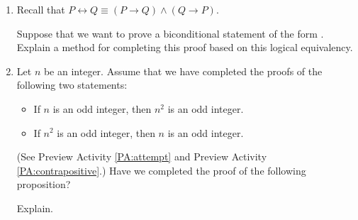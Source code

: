 \hbreak
%
\pagebreak
\begin{previewactivity}\label{PA:biconditional} \hfill
{}%
%
%
\begin{enumerate}

  \item Recall that  
$P \leftrightarrow Q \equiv \left( {P \to Q} \right) \wedge \left( {Q \to P} \right)$.

Suppose that we want to prove a biconditional statement of the form  
.  Explain a method for completing this proof based on this logical equivalency.

  \item Let  $n$  be an integer.  Assume that we have completed the proofs of the following two statements:

  \begin{itemize}
    \item If  $n$  is an odd integer, then  $n^2 $ is an odd integer.
    \item If  $ n^2 $ is an odd integer, then  $n$  is an odd integer.
  \end{itemize}

(See Preview Activity \ref{PA:attempt} and Preview Activity \ref{PA:contrapositive}.)  Have we completed the proof of the following proposition?


Explain.
 
\end{enumerate}
\hbreak
\end{previewactivity}

\endinput
